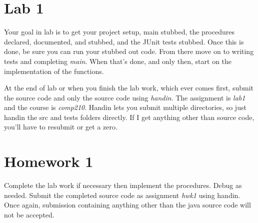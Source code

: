 \documentclass[]{tufte-handout}
\begin{document}
\section{Lab 1}

Your goal in lab is to get your project setup, main stubbed, the procedures declared, documented, and stubbed, and the JUnit tests stubbed. Once this is done, be sure you can run your stubbed out code. From there move on to writing tests and completing \textit{main}.  When that's done, and only then, start on the implementation of the functions. 

At the end of lab or when you finish the lab work, which ever comes first, submit the source code and only the source code using \textit{handin}. The assignment is \textit{lab1} and the course is \textit{comp210}. Handin lets you submit multiple directories, so just handin the src and tests folders directly. If I get anything other than source code, you'll have to resubmit or get a zero.

\section{Homework 1}

Complete the lab work if necessary then implement the procedures. Debug as needed. Submit the completed source code as assignment \textit{hwk1} using handin. Once again, submission containing anything other than the java source code will not be accepted. 
\end{document}

